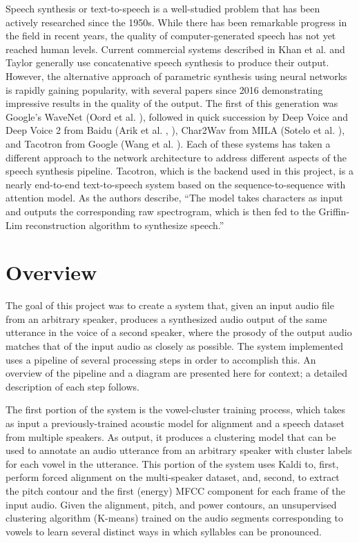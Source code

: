 \documentclass{article}
\begin{document}
Speech synthesis or text-to-speech is a well-studied problem that has been actively researched since the 1950s. While there has been remarkable progress in the field in recent years, the quality of computer-generated speech has not yet reached human levels. Current commercial systems described in Khan et al. \cite{khan2016concatenative} and Taylor  \cite{taylor2009text} generally use concatenative speech synthesis to produce their output. However, the alternative approach of parametric synthesis using neural networks is rapidly gaining popularity, with several papers since 2016 demonstrating impressive results in the quality of the output.
The first of this generation was Google's WaveNet (Oord et al. \cite{oord2016wavenet}), followed in quick succession by Deep Voice and Deep Voice 2 from Baidu (Arik et al. \cite{arik2017deep}, \cite{arik2017deep2}), Char2Wav from MILA (Sotelo et al. \cite{sotelo2017char2wav}), and Tacotron from Google (Wang et al. \cite{wang2017tacotron}).
Each of these systems has taken a different approach to the network architecture to address different aspects of the speech synthesis pipeline. Tacotron, which is the backend used in this project, is a nearly end-to-end text-to-speech system based on the sequence-to-sequence with attention model. As the authors describe, ``The model takes characters as input and outputs the corresponding raw spectrogram, which is then fed to the Griffin-Lim reconstruction algorithm to synthesize speech.''

\section{Overview}
\label{sec:overview}
The goal of this project was to create a system that, given an input audio file from an arbitrary speaker, produces a synthesized audio output of the same utterance in the voice of a second speaker, where the prosody of the output audio matches that of the input audio as closely as possible. The system implemented uses a pipeline of several processing steps in order to accomplish this. An overview of the pipeline and a diagram are presented here for context; a detailed description of each step follows.

The first portion of the system is the vowel-cluster training process, which takes as input a previously-trained acoustic model for alignment and a speech dataset from multiple speakers. As output, it produces a clustering model that can be used to annotate an audio utterance from an arbitrary speaker with cluster labels for each vowel in the utterance. This portion of the system uses Kaldi to, first, perform forced alignment on the multi-speaker dataset, and, second, to extract the pitch contour and the first (energy) MFCC component for each frame of the input audio. Given the alignment, pitch, and power contours, an unsupervised clustering algorithm (K-means) trained on the audio segments corresponding to vowels to learn several distinct ways in which syllables can be pronounced.
\end{document}
